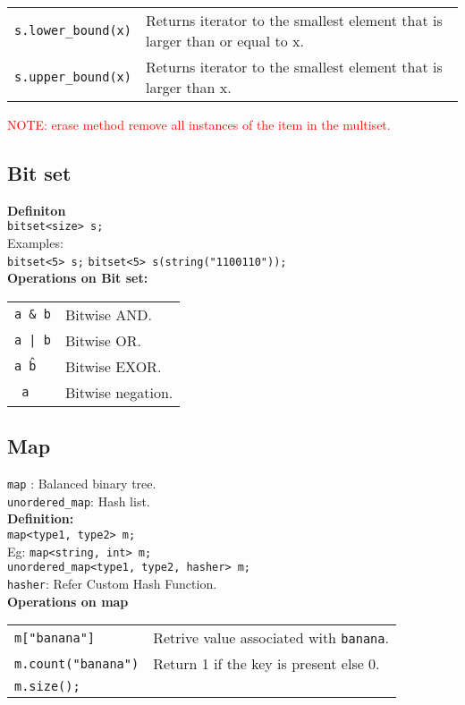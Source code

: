 \begin{tabularx}{\linewidth}{lX}
\texttt{s.lower\_bound(x)} & Returns iterator to the smallest element that is larger than or equal to x.\\
\texttt{s.upper\_bound(x)} & Returns iterator to the smallest element that is larger than x.\\
\end{tabularx}

\textcolor{red}{NOTE: erase method remove all instances of the item in the multiset.}

\subsection{Bit set}

\textbf{Definiton}\\
\texttt{bitset<size> s;}\\
Examples:\\
\texttt{bitset<5> s;}
\texttt{bitset<5> s(string("1100110"));}\\
\textbf{Operations on Bit set:}\\
\begin{tabularx}{\linewidth}{lX}
\texttt{a \& b} & Bitwise AND.\\
\texttt{a | b} & Bitwise OR.\\
\texttt{a \^ b} & Bitwise EXOR.\\
\texttt{~a} & Bitwise negation.\\
\end{tabularx}

\subsection{Map}

\texttt{map} : Balanced binary tree.\\
\texttt{unordered\_map}: Hash list.\\

\textbf{Definition:}\\
\texttt{map<type1, type2> m;}\\
Eg: \texttt{map<string, int> m;}\\
\texttt{unordered\_map<type1, type2, hasher> m;}\\
\texttt{hasher}: Refer Custom Hash Function.\\

\textbf{Operations on map}\\
\begin{tabularx}{\linewidth}{lX}
\texttt{m["banana"]} & Retrive value associated with \texttt{banana}.\\
\texttt{m.count("banana")} & Return 1 if the key is present else 0.\\
\texttt{m.size();} & \\
\end{tabularx}

